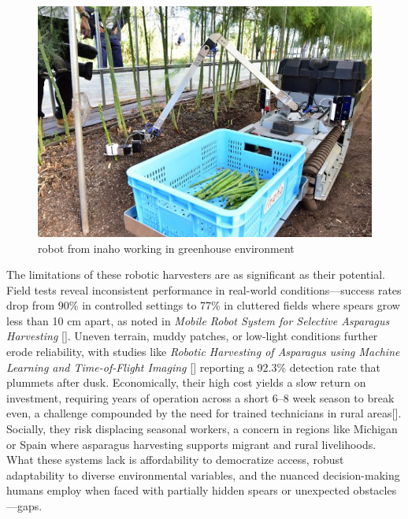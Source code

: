 \begin{figure}
    \centering
    \includegraphics[width=0.75\linewidth]{pictures/INAHOROBOT.png}
    \caption{robot from inaho working in greenhouse environment}
    \label{fig:enter-label}
\end{figure}



The limitations of these robotic harvesters are as significant as their potential. Field tests reveal inconsistent performance in real-world conditions—success rates drop from 90\% in controlled settings to 77\% in cluttered fields where spears grow less than 10 cm apart, as noted in \textit{Mobile Robot System for Selective Asparagus Harvesting} [\cite{mdpi2023mobile}]. Uneven terrain, muddy patches, or low-light conditions further erode reliability, with studies like \textit{Robotic Harvesting of Asparagus using Machine Learning and Time-of-Flight Imaging} [\cite{peebles2022robotic}] reporting a 92.3\% detection rate that plummets after dusk. Economically, their high cost yields a slow return on investment, requiring years of operation across a short 6--8 week season to break even, a challenge compounded by the need for trained technicians in rural areas[\cite{waea2004simulation}]. Socially, they risk displacing seasonal workers, a concern in regions like Michigan or Spain where asparagus harvesting supports migrant and rural livelihoods. What these systems lack is affordability to democratize access, robust adaptability to diverse environmental variables, and the nuanced decision-making humans employ when faced with partially hidden spears or unexpected obstacles—gaps.

